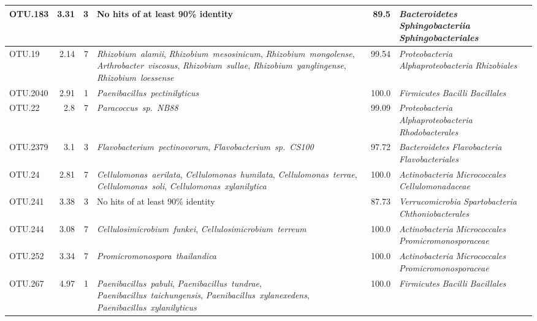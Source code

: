 \begin{ThreePartTable}
\begin{longtable}{lrrP{5cm}rP{5cm}}
OTU.183 & 3.31 & 3 & {No hits of at least 90\% identity} & 89.5 & \mbox{\textit{Bacteroidetes}} \mbox{\textit{Sphingobacteriia}} \mbox{\textit{Sphingobacteriales}} \\ \midrule
OTU.19 & 2.14 & 7 & \mbox{\textit{Rhizobium alamii}}, \mbox{\textit{Rhizobium mesosinicum}}, \mbox{\textit{Rhizobium mongolense}}, \mbox{\textit{Arthrobacter viscosus}}, \mbox{\textit{Rhizobium sullae}}, \mbox{\textit{Rhizobium yanglingense}}, \mbox{\textit{Rhizobium loessense}} & 99.54 & \mbox{\textit{Proteobacteria}} \mbox{\textit{Alphaproteobacteria}} \mbox{\textit{Rhizobiales}} \\ \midrule
OTU.2040 & 2.91 & 1 & \mbox{\textit{Paenibacillus pectinilyticus}} & 100.0 & \mbox{\textit{Firmicutes}} \mbox{\textit{Bacilli}} \mbox{\textit{Bacillales}} \\ \midrule
OTU.22 & 2.8 & 7 & \mbox{\textit{Paracoccus sp. NB88}} & 99.09 & \mbox{\textit{Proteobacteria}} \mbox{\textit{Alphaproteobacteria}} \mbox{\textit{Rhodobacterales}} \\ \midrule
OTU.2379 & 3.1 & 3 & \mbox{\textit{Flavobacterium pectinovorum}}, \mbox{\textit{Flavobacterium sp. CS100}} & 97.72 & \mbox{\textit{Bacteroidetes}} \mbox{\textit{Flavobacteria}} \mbox{\textit{Flavobacteriales}} \\ \midrule
OTU.24 & 2.81 & 7 & \mbox{\textit{Cellulomonas aerilata}}, \mbox{\textit{Cellulomonas humilata}}, \mbox{\textit{Cellulomonas terrae}}, \mbox{\textit{Cellulomonas soli}}, \mbox{\textit{Cellulomonas xylanilytica}} & 100.0 & \mbox{\textit{Actinobacteria}} \mbox{\textit{Micrococcales}} \mbox{\textit{Cellulomonadaceae}} \\ \midrule
OTU.241 & 3.38 & 3 & {No hits of at least 90\% identity} & 87.73 & \mbox{\textit{Verrucomicrobia}} \mbox{\textit{Spartobacteria}} \mbox{\textit{Chthoniobacterales}} \\ \midrule
OTU.244 & 3.08 & 7 & \mbox{\textit{Cellulosimicrobium funkei}}, \mbox{\textit{Cellulosimicrobium terreum}} & 100.0 & \mbox{\textit{Actinobacteria}} \mbox{\textit{Micrococcales}} \mbox{\textit{Promicromonosporaceae}} \\ \midrule
OTU.252 & 3.34 & 7 & \mbox{\textit{Promicromonospora thailandica}} & 100.0 & \mbox{\textit{Actinobacteria}} \mbox{\textit{Micrococcales}} \mbox{\textit{Promicromonosporaceae}} \\ \midrule
OTU.267 & 4.97 & 1 & \mbox{\textit{Paenibacillus pabuli}}, \mbox{\textit{Paenibacillus tundrae}}, \mbox{\textit{Paenibacillus taichungensis}}, \mbox{\textit{Paenibacillus xylanexedens}}, \mbox{\textit{Paenibacillus xylanilyticus}} & 100.0 & \mbox{\textit{Firmicutes}} \mbox{\textit{Bacilli}} \mbox{\textit{Bacillales}} \\ \midrule

\end{longtable}
\end{ThreePartTable}
